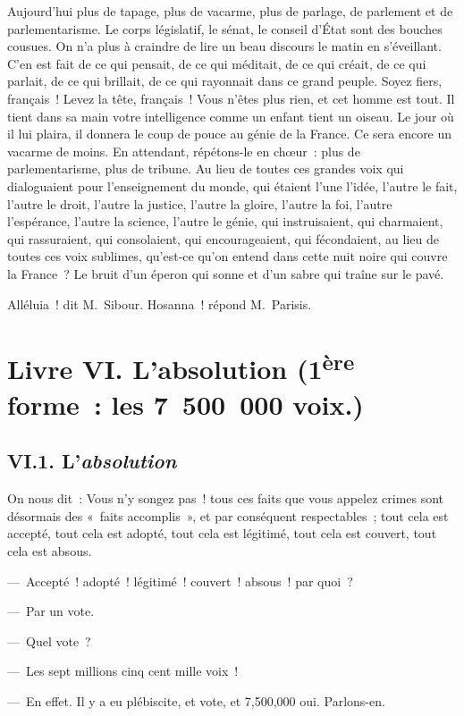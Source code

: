 \documentclass[french,twoside]{book} %
\begin{document}
Aujourd’hui plus de tapage, plus de vacarme, plus de parlage, de parlement et de parlementarisme. Le corps législatif, le sénat, le conseil d’État sont des bouches cousues. On n’a plus à craindre de lire un beau discours le matin en s’éveillant. C’en est fait de ce qui pensait, de ce qui méditait, de ce qui créait, de ce qui parlait, de ce qui brillait, de ce qui rayonnait dans ce grand peuple. Soyez fiers, français ! Levez la tête, français ! Vous n’êtes plus rien, et cet homme est tout. Il tient dans sa main votre intelligence comme un enfant tient un oiseau. Le jour où il lui plaira, il donnera le coup de pouce au génie de la France. Ce sera encore un vacarme de moins. En attendant, répétons-le en chœur : plus de parlementarisme, plus de tribune. Au lieu de toutes ces grandes voix qui dialoguaient pour l’enseignement du monde, qui étaient l’une l’idée, l’autre le fait, l’autre le droit, l’autre la justice, l’autre la gloire, l’autre la foi, l’autre l’espérance, l’autre la science, l’autre le génie, qui instruisaient, qui charmaient, qui rassuraient, qui consolaient, qui encourageaient, qui fécondaient, au lieu de toutes ces voix sublimes, qu’est-ce qu’on entend dans cette nuit noire qui couvre la France ? Le bruit d’un éperon qui sonne et d’un sabre qui traîne sur le pavé.\par
Alléluia ! dit M. Sibour. Hosanna ! répond M. Parisis.
\section[{Livre VI. L’absolution (1ère forme : les 7 500 000 voix.)}]{Livre VI. L’absolution (1\textsuperscript{ère} forme : les 7 500 000 voix.)}\renewcommand{\leftmark}{Livre VI. L’absolution (1\textsuperscript{ère} forme : les 7 500 000 voix.)}

\subsection[{VI.1. L’absolution}]{VI.1. L’\emph{absolution}}
\noindent On nous dit : Vous n’y songez pas ! tous ces faits que vous appelez crimes sont désormais des « faits accomplis », et par conséquent respectables ; tout cela est accepté, tout cela est adopté, tout cela est légitimé, tout cela est couvert, tout cela est absous.\par
— Accepté ! adopté ! légitimé ! couvert ! absous ! par quoi ?\par
— Par un vote.\par
— Quel vote ?\par
— Les sept millions cinq cent mille voix !\par
— En effet. Il y a eu plébiscite, et vote, et 7,500,000 oui. Parlons-en.
\end{document}
